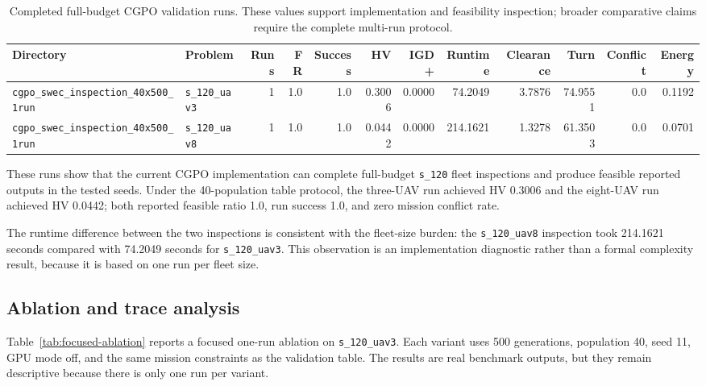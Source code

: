 \documentclass[a4paper,fleqn]{cas-dc}
\begin{document}
\begin{table}[t]
\centering
\scriptsize
\caption{Completed full-budget CGPO validation runs. These values support implementation and feasibility inspection; broader comparative claims require the complete multi-run protocol.}
\label{tab:inspection}
\begin{tabular}{llrrrrrrrrrr}
\toprule
Directory & Problem & Runs & FR & Success & HV & IGD+ & Runtime & Clearance & Turn & Conflict & Energy \\
\midrule
\texttt{cgpo\_swec\_inspection\_40x500\_1run} & \texttt{s\_120\_uav3} & 1 & 1.0 & 1.0 & 0.3006 & 0.0000 & 74.2049 & 3.7876 & 74.9551 & 0.0 & 0.1192 \\
\texttt{cgpo\_swec\_inspection\_40x500\_1run} & \texttt{s\_120\_uav8} & 1 & 1.0 & 1.0 & 0.0442 & 0.0000 & 214.1621 & 1.3278 & 61.3503 & 0.0 & 0.0701 \\
\bottomrule
\end{tabular}
\end{table}

These runs show that the current CGPO implementation can complete full-budget \texttt{s\_120} fleet inspections and produce feasible reported outputs in the tested seeds. Under the 40-population table protocol, the three-UAV run achieved HV 0.3006 and the eight-UAV run achieved HV 0.0442; both reported feasible ratio 1.0, run success 1.0, and zero mission conflict rate.

The runtime difference between the two inspections is consistent with the fleet-size burden: the \texttt{s\_120\_uav8} inspection took 214.1621 seconds compared with 74.2049 seconds for \texttt{s\_120\_uav3}. This observation is an implementation diagnostic rather than a formal complexity result, because it is based on one run per fleet size.

\subsection{Ablation and trace analysis}

Table~\ref{tab:focused-ablation} reports a focused one-run ablation on \texttt{s\_120\_uav3}. Each variant uses 500 generations, population 40, seed 11, GPU mode off, and the same mission constraints as the validation table. The results are real benchmark outputs, but they remain descriptive because there is only one run per variant.
\end{document}

